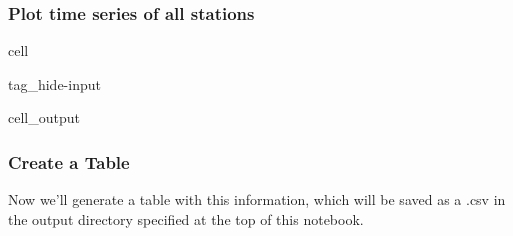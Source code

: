 \documentclass[letterpaper,10pt,english]{jupyterBook}
\begin{document}
\subsubsection{Plot time series of all stations}
\label{\detokenize{notebooks/FloodFrequency:plot-time-series-of-all-stations}}
\begin{sphinxuseclass}{cell}
\begin{sphinxuseclass}{tag_hide-input}\begin{sphinxVerbatimOutput}

\begin{sphinxuseclass}{cell_output}
\noindent{}

\end{sphinxuseclass}\end{sphinxVerbatimOutput}

\end{sphinxuseclass}
\end{sphinxuseclass}

\subsubsection{Create a Table}
\label{\detokenize{notebooks/FloodFrequency:create-a-table}}
\sphinxAtStartPar
Now we’ll generate a table with this information, which will be saved as a .csv in the output directory specified at the top of this notebook.
\end{document}
